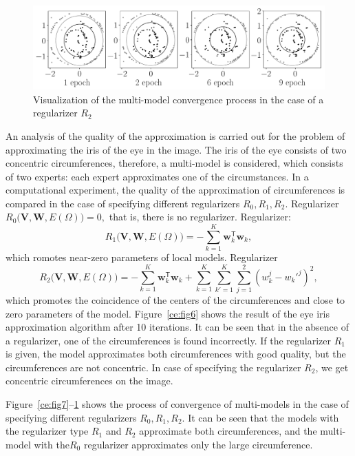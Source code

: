 \begin{figure}
     \includegraphics[width=\textwidth]{results/priorexpertfig/experiment_real_regular}
     \caption{Visualization of the multi-model convergence process in the case of a regularizer $R_2$}
    \label{ce:fig9}
\end{figure}

An analysis of the quality of the approximation is carried out for the problem of approximating the iris of the eye in the image. The iris of the eye consists of two concentric circumferences, therefore, a multi-model is considered, which consists of two experts: each expert approximates one of the circumstances. In a computational experiment, the quality of the approximation of circumferences is compared in the case of specifying different regularizers $R_0, R_1, R_2$. Regularizer$R_0\bigl(\mathbf{V}, \mathbf{W}, E(\Omega)\bigr)=0,$ that is, there is no regularizer. Regularizer:
\[
R_1\bigl(\mathbf{V}, \mathbf{W}, E(\Omega)\bigr)= -\sum_{k=1}^{K}\mathbf{w}_k^{\mathsf{T}}\mathbf{w}_k,
\]
which romotes near-zero parameters of local models.
Regularizer 
\[
R_2\bigl(\mathbf{V}, \mathbf{W}, E(\Omega)\bigr)= -\sum_{k=1}^{K}\mathbf{w}_k^{\mathsf{T}}\mathbf{w}_k + \sum_{k=1}^{K}\sum_{k'=1}^{K}\sum_{j=1}^2\left(w_k^j-w_k'^j\right)^2,\]
which promotes the coincidence of the centers of the circumferences and close to zero parameters of the model.
Figure~\ref{ce:fig6} shows the result of the eye iris approximation algorithm after 10 iterations. It can be seen that in the absence of a regularizer, one of the circumferences is found incorrectly. If the regularizer $R_1 $ is given, the model approximates both circumferences with good quality, but the circumferences are not concentric. In case of specifying the regularizer $R_2$, we get concentric circumferences on the image.

Figure~\ref{ce:fig7}--\ref{ce:fig9} shows the process of convergence of multi-models in the case of specifying different regularizers $R_0, R_1, R_2$. It can be seen that the models with the regularizer type $R_1$ and $R_2$ approximate both circumferences, and the multi-model with the$R_0$ regularizer approximates only the large circumference.
